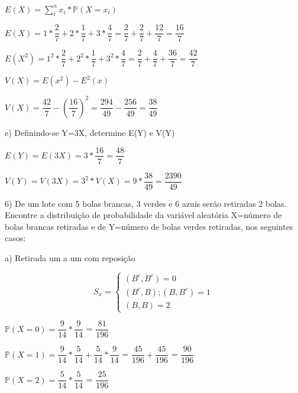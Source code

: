 \documentclass[12pt,a4paper]{article}
\begin{document}
\begin{center}
	\vspace{0.25cm}
	$E(X) = \sum_{i}^{n} x_{i}*\mathbb{P}(X = x_{i})$
	
	\vspace{1cm}
	$E(X) = 1*\dfrac{2}{7}+2*\dfrac{1}{7}+3*\dfrac{4}{7} = \dfrac{2}{7} + \dfrac{2}{7} + \dfrac{12}{7} = \dfrac{16}{7}$
	
	\vspace{0.5cm}
	$E(X^{2}) = 1^{2}*\dfrac{2}{7}+2^{2}*\dfrac{1}{7}+3^{2}*\dfrac{4}{7} = \dfrac{2}{7} + \dfrac{4}{7} + \dfrac{36}{7} = \dfrac{42}{7}$
	
	\vspace{1cm}
	$V(X) = E(x^{2}) - E^{2}(x)$
	
	\vspace{1cm}
	$V(X) = \dfrac{42}{7}-\left(\dfrac{16}{7}\right)^{2} = \dfrac{294}{49}-\dfrac{256}{49} = \dfrac{38}{49}$
\end{center}

e) Definindo-se Y=3X, determine E(Y) e V(Y)

\begin{center}
	\vspace{0.25cm}
	$E(Y) = E(3X) = 3*\dfrac{16}{7} = \dfrac{48}{7}$ 
	
	\vspace{1cm}
	$V(Y) = V(3X) = 3^{2}*V(X) = 9*\dfrac{38}{49} = \dfrac{2390}{49}$
\end{center}

\vspace{1cm}
6) De um lote com 5 bolas brancas, 3 verdes e 6 azuis serão retiradas 2 bolas. Encontre a distribuição de probabilidade da variável aleatória X=número de bolas brancas retiradas e de Y=número de bolas verdes retiradas, nos seguintes casos:

a) Retirada um a um com reposição

\[
S_{x} =
\begin{cases}
(B^{c},B^{c}) = 0 \\
(B^{c},B);(B,B^{c}) = 1\\
(B,B) = 2
\end{cases}
\]

\begin{center}
	\vspace{0.5cm}
	$\mathbb{P}(X=0) = \dfrac{9}{14}*\dfrac{9}{14}$ = $\dfrac{81}{196}$
	
	\vspace{0.5cm}
	$\mathbb{P}(X=1) = \dfrac{9}{14}*\dfrac{5}{14} + \dfrac{5}{14}*\dfrac{9}{14}$ = $\dfrac{45}{196} + \dfrac{45}{196}$ = $\dfrac{90}{196}$
	
	\vspace{0.5cm}
	$\mathbb{P}(X=2) = \dfrac{5}{14}*\dfrac{5}{14}$ = $\dfrac{25}{196}$
\end{center}
\end{document}
